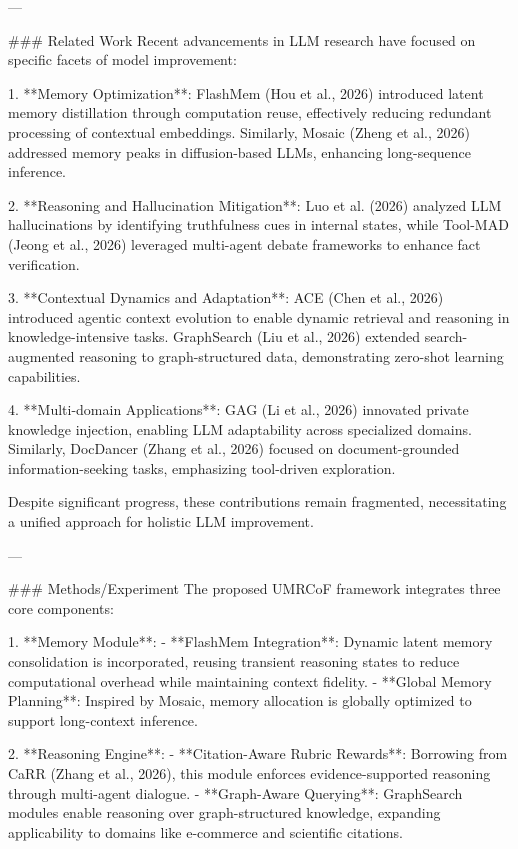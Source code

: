 ---

### Related Work  
Recent advancements in LLM research have focused on specific facets of model improvement:  

1. **Memory Optimization**:  
   FlashMem (Hou et al., 2026) introduced latent memory distillation through computation reuse, effectively reducing redundant processing of contextual embeddings. Similarly, Mosaic (Zheng et al., 2026) addressed memory peaks in diffusion-based LLMs, enhancing long-sequence inference.

2. **Reasoning and Hallucination Mitigation**:  
   Luo et al. (2026) analyzed LLM hallucinations by identifying truthfulness cues in internal states, while Tool-MAD (Jeong et al., 2026) leveraged multi-agent debate frameworks to enhance fact verification.

3. **Contextual Dynamics and Adaptation**:  
   ACE (Chen et al., 2026) introduced agentic context evolution to enable dynamic retrieval and reasoning in knowledge-intensive tasks. GraphSearch (Liu et al., 2026) extended search-augmented reasoning to graph-structured data, demonstrating zero-shot learning capabilities.

4. **Multi-domain Applications**:  
   GAG (Li et al., 2026) innovated private knowledge injection, enabling LLM adaptability across specialized domains. Similarly, DocDancer (Zhang et al., 2026) focused on document-grounded information-seeking tasks, emphasizing tool-driven exploration.

Despite significant progress, these contributions remain fragmented, necessitating a unified approach for holistic LLM improvement.

---

### Methods/Experiment  
The proposed UMRCoF framework integrates three core components:

1. **Memory Module**:  
   - **FlashMem Integration**: Dynamic latent memory consolidation is incorporated, reusing transient reasoning states to reduce computational overhead while maintaining context fidelity.
   - **Global Memory Planning**: Inspired by Mosaic, memory allocation is globally optimized to support long-context inference.

2. **Reasoning Engine**:  
   - **Citation-Aware Rubric Rewards**: Borrowing from CaRR (Zhang et al., 2026), this module enforces evidence-supported reasoning through multi-agent dialogue.
   - **Graph-Aware Querying**: GraphSearch modules enable reasoning over graph-structured knowledge, expanding applicability to domains like e-commerce and scientific citations.

